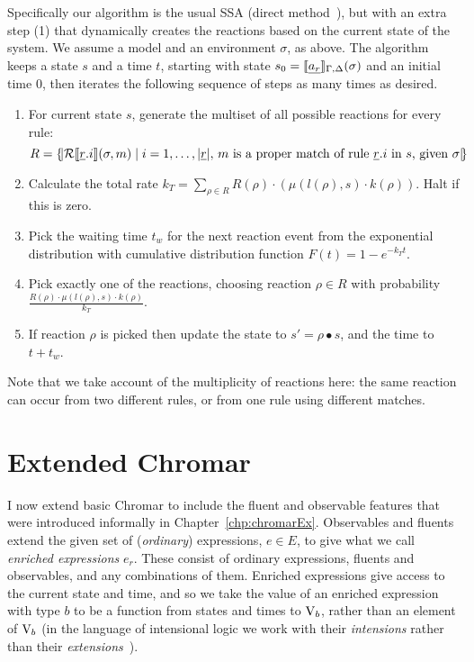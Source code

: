 Specifically our algorithm is the usual SSA (direct
method~\cite{gillespie1977exact}), but with an extra step (1) that dynamically
creates the reactions based on the current state of the system. We assume a
model and an environment $\sigma$, as above. The algorithm keeps a state $s$ and a
time $t$, starting with state $s_0 = \llbracket \underline{a_r} \rrbracket_{\Gamma,\Delta}(\sigma)$ and an initial time
$0$, then iterates the following sequence of steps as many times as desired.
\begin{enumerate}
\item For current state $s$, generate the multiset of all possible reactions for
  every rule:
$$R  = \{\!|  \mathcal{R}\llbracket \underline{r}.i \rrbracket(\sigma, m) \; | \; i = 1,\ldots, |\underline{r}|, \, m \mbox{ is a proper match of rule $\underline{r}.i$ in $s$, given $\sigma$} |\!\}$$ 
\item Calculate the total rate
  $k_T = \sum_{\rho \in R} R(\rho)\cdot (\mu(l(\rho), s)\cdot k(\rho))$. Halt if this is zero.
\item Pick the waiting time $t_w$ for the next reaction event from the
  exponential distribution with cumulative distribution function
  $F(t) = 1- e^{-k_T t}$.
\item Pick exactly one of the reactions, choosing reaction $\rho \in R$ with
  probability $\frac{R(\rho)\cdot \mu(l(\rho), s) \cdot k(\rho)}{k_T}$.
\item If reaction $\rho$ is picked then update the state to
  $s' = \rho \bullet s$, and the time to $t + t_w$.
\end{enumerate}

Note that we take account of the multiplicity of reactions here: the same
reaction can occur from two different rules, or from one rule using different
matches.

\section{Extended Chromar} 
\label{sec:extChromar} 
I now extend basic Chromar to include the fluent and observable features that
were introduced informally in Chapter~\ref{chp:chromarEx}. Observables and
fluents extend the given set of (\emph{ordinary}) expressions, $e \in E$, to
give what we call \emph{enriched expressions} $e_r$. These consist of ordinary
expressions, fluents and observables, and any combinations of them. Enriched
expressions give access to the current state and time, and so we take the value
of an enriched expression with type $b$ to be a function from states and times
to $\mathrm{V}_b$, rather than an element of $\mathrm{V}_b$ (in the language of intensional
logic we work with their \emph{intensions} rather than their
\emph{extensions}~\cite{Stan,Fit}).

